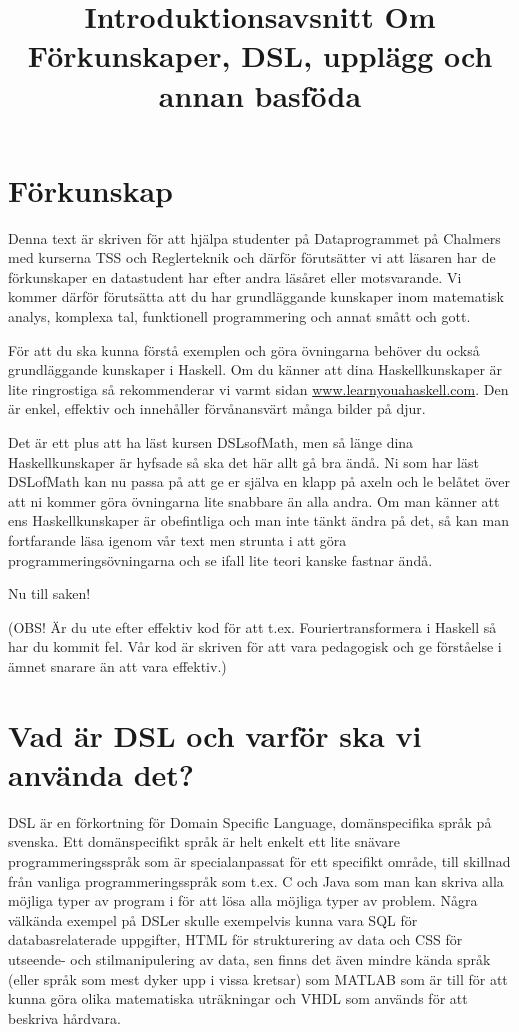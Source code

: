 \documentclass{article}
\title{Introduktionsavsnitt
\large Om Förkunskaper, DSL, upplägg och annan basföda}
\author{}
\date{}
\begin{document}
\maketitle

\section{Förkunskap}

Denna text är skriven för att hjälpa studenter på Dataprogrammet på Chalmers med
kurserna TSS och Reglerteknik och därför förutsätter vi att läsaren har de
förkunskaper en datastudent har efter andra läsåret eller motsvarande.
Vi kommer därför förutsätta att du har grundläggande kunskaper inom matematisk
analys, komplexa tal, funktionell programmering och annat smått och gott.

För att du ska kunna förstå exemplen och göra övningarna behöver du också
grundläggande kunskaper i Haskell. Om du känner att dina Haskellkunskaper är
lite ringrostiga så rekommenderar vi varmt sidan \url{www.learnyouahaskell.com}.
Den är enkel, effektiv och innehåller förvånansvärt många bilder på djur.

Det är ett plus att ha läst kursen DSLsofMath, men så länge dina
Haskellkunskaper är hyfsade så ska det här allt gå bra ändå.
Ni som har läst DSLofMath kan nu passa på att ge er själva en klapp på axeln
och le belåtet över att ni kommer göra övningarna lite snabbare än alla andra.
Om man känner att ens Haskellkunskaper är obefintliga och man inte tänkt ändra
på det, så kan man fortfarande läsa igenom vår text men strunta i
att göra programmeringsövningarna och se ifall lite teori kanske fastnar ändå.

Nu till saken!

(OBS! Är du ute efter effektiv kod för att t.ex. Fouriertransformera i Haskell så har du kommit fel. Vår kod är skriven för att vara pedagogisk och ge förståelse i ämnet snarare än att vara effektiv.)

\newpage

\section{Vad är DSL och varför ska vi använda det?}
DSL är en förkortning för Domain Specific Language,
domänspecifika språk på svenska.
Ett domänspecifikt språk är helt enkelt ett lite snävare programmeringsspråk
som är specialanpassat för ett specifikt område, till skillnad från vanliga
programmeringsspråk som t.ex. C och Java som man kan skriva alla möjliga typer
av program i för att lösa alla möjliga typer av problem.
Några välkända exempel på DSLer skulle exempelvis kunna vara SQL för
databasrelaterade uppgifter, HTML för strukturering av data och CSS för
utseende- och stilmanipulering av data, sen finns det även mindre kända
språk (eller språk som mest dyker upp i vissa kretsar) som MATLAB som är
till för att kunna göra olika matematiska uträkningar och VHDL som används
för att beskriva hårdvara.
\end{document}
